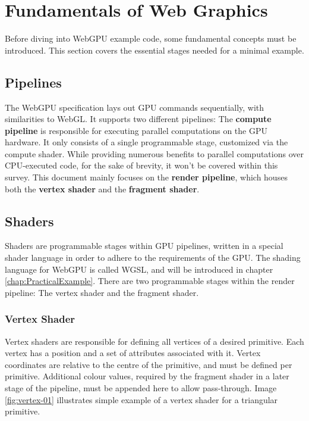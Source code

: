 %
%
% 
% 

\chapter{Fundamentals of Web Graphics}

\label{chap:Fundamentals}

Before diving into WebGPU example code, some fundamental concepts must be introduced.
This section covers the essential stages needed for a minimal example.

\section{Pipelines}
The WebGPU specification lays out GPU commands sequentially, with similarities to WebGL.
It supports two different pipelines:
The \textbf{compute pipeline} is responsible for executing parallel
computations on the GPU hardware. It only consists of a single programmable
stage, customized via the compute shader.
While providing numerous benefits to parallel computations over CPU-executed code, for the sake of brevity, it won't be covered within this survey.
This document mainly focuses on the \textbf{render pipeline}, which houses both the \textbf{vertex shader} and the \textbf{fragment shader}.

\section{Shaders}
Shaders are programmable stages within GPU pipelines, written in a special shader language in order to adhere
to the requirements of the GPU.
The shading language for WebGPU is called WGSL, and will be introduced in chapter \ref{chap:PracticalExample}.
There are two programmable stages within the render pipeline:
The vertex shader and the fragment shader.

\subsection{Vertex Shader}
Vertex shaders are responsible for defining all vertices of a desired primitive.
Each vertex has a position and a set of attributes associated with it.
Vertex coordinates are relative to the centre of the primitive, and must be defined per primitive.
Additional colour values, required by the fragment shader in a later stage of the pipeline, must be appended here to allow pass-through.
Image \ref{fig:vertex-01} illustrates simple example of a vertex shader for a triangular primitive.

